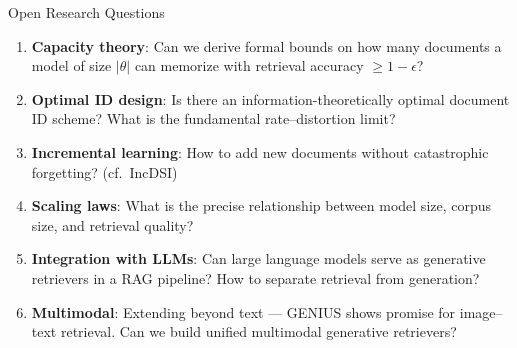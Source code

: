\documentclass[aspectratio=169,11pt]{beamer}
\begin{document}
\begin{frame}{Open Research Questions}
\begin{enumerate}
    \item \textbf{Capacity theory}: Can we derive formal bounds on how many documents a model of size $|\theta|$ can memorize with retrieval accuracy $\geq 1 - \epsilon$?

    \vspace{0.15cm}
    \item \textbf{Optimal ID design}: Is there an information-theoretically optimal document ID scheme? What is the fundamental rate--distortion limit?

    \vspace{0.15cm}
    \item \textbf{Incremental learning}: How to add new documents without catastrophic forgetting? (cf.\ IncDSI)

    \vspace{0.15cm}
    \item \textbf{Scaling laws}: What is the precise relationship between model size, corpus size, and retrieval quality?

    \vspace{0.15cm}
    \item \textbf{Integration with LLMs}: Can large language models serve as generative retrievers in a RAG pipeline? How to separate retrieval from generation?

    \vspace{0.15cm}
    \item \textbf{Multimodal}: Extending beyond text --- GENIUS shows promise for image--text retrieval. Can we build unified multimodal generative retrievers?
\end{enumerate}
\end{frame}

\end{document}
